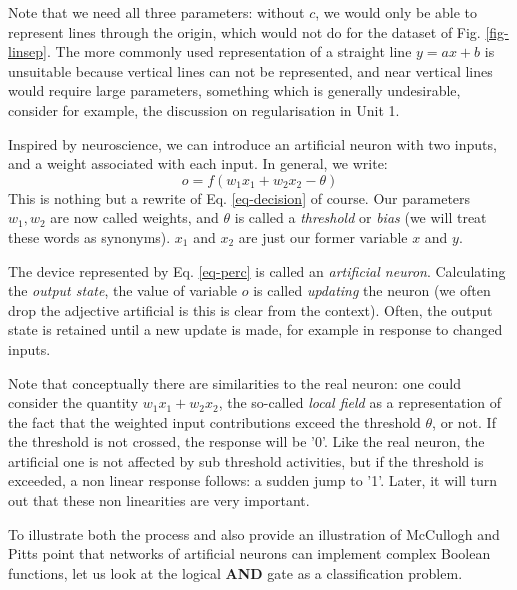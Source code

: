 Note that we need all three parameters: without $c$, we would only be able to represent lines through the origin, which would not do for the dataset of Fig. \ref{fig-linsep}.
The more commonly used representation of a straight line $y = ax + b$ is unsuitable because vertical lines can not be represented, and near vertical lines would
require large parameters, something which is generally undesirable, consider for example, the discussion on regularisation in Unit 1.

Inspired by neuroscience, we can introduce an artificial neuron with two inputs, and a weight associated with each input. In general, we write:
\begin{equation}
  o = f(w_1 x_1 + w_2 x_2 -\theta)
  \label{eq-perc}
\end{equation}
This is nothing but a rewrite of Eq. \ref{eq-decision} of course. Our parameters $w_1, w_2$ are now called weights, and $\theta$ is called a \emph{threshold} or
\emph{bias} (we will treat these words as synonyms).
$x_1$ and $x_2$ are just our former variable $x$ and $y$.

The device represented by Eq. \ref{eq-perc} is called an \emph{artificial neuron}. Calculating the \emph{output state}, the value of variable $o$ is called \emph{updating}
the neuron (we often drop the adjective artificial is this is clear from the context). Often, the output state is retained until a new update is made, for example in
response to changed inputs.

Note that conceptually there are similarities to the real neuron: one could consider the quantity $w_1 x_1 + w_2x_2$, the so-called \emph{local field} as a representation
of the fact that the weighted input contributions exceed the threshold $\theta$, or not. If the threshold is not crossed, the response will be '0'. Like the real neuron, the
artificial one is not affected by sub threshold activities, but if the threshold is exceeded, a non linear response follows: a sudden jump to '1'.  Later, it will turn out that these non linearities are very important.




To illustrate both the process and also provide an illustration of McCullogh and Pitts point that networks of artificial neurons can implement complex Boolean functions, let
us look at the logical {\bf AND} gate as a classification problem.

